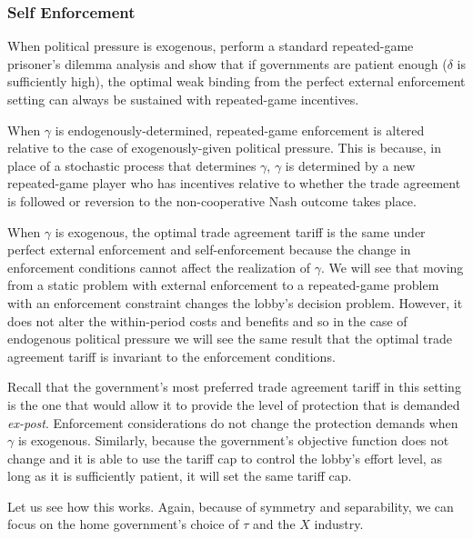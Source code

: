 \documentclass[12pt]{article}
\newcommand{\ga}{\gamma}
\newcommand{\de}{\delta}
\begin{document}
\subsubsection{Self Enforcement}
\label{sec:selfweak}
When political pressure is exogenous, \Textcite{bs2005} perform a standard repeated-game prisoner's dilemma analysis and show that if governments are patient enough ($\de$ is sufficiently high), the optimal weak binding from the perfect external enforcement setting can always be sustained with repeated-game incentives.

When $\ga$ is endogenously-determined, repeated-game enforcement is altered relative to the case of exogenously-given political pressure. This is because, in place of a stochastic process that determines $\ga$, $\ga$ is determined by a new repeated-game player who has incentives relative to whether the trade agreement is followed or reversion to the non-cooperative Nash outcome takes place.

When $\ga$ is exogenous, the optimal trade agreement tariff is the same under perfect external enforcement and self-enforcement because the change in enforcement conditions cannot affect the realization of $\ga$. We will see that moving from a static problem with external enforcement to a repeated-game problem with an enforcement constraint changes the lobby's decision problem. However, it does not alter the within-period costs and benefits and so in the case of endogenous political pressure we will see the same result that the optimal trade agreement tariff is invariant to the enforcement conditions.

Recall that the government's most preferred trade agreement tariff in this setting is the one that would allow it to provide the level of protection that is demanded \textit{ex-post}. Enforcement considerations do not change the protection demands when $\ga$ is exogenous. Similarly, because the government's objective function does not change and it is able to use the tariff cap to control the lobby's effort level, as long as it is sufficiently patient, it will set the same tariff cap.

Let us see how this works. Again, because of symmetry and separability, we can focus on the home government's choice of $\tau$ and the $X$ industry.
\end{document}
